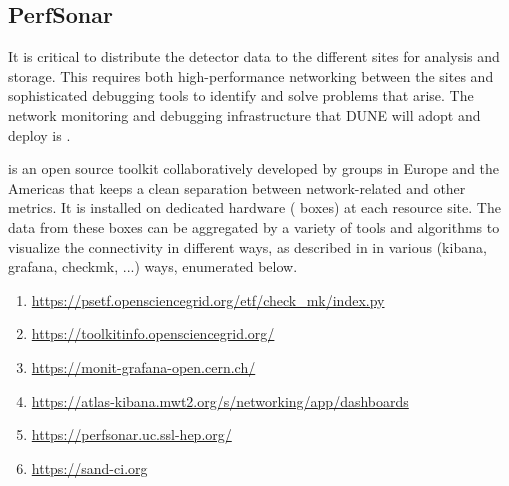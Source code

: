 \documentclass[../main-v1.tex]{subfiles}
\begin{document}


\subsection{PerfSonar}

It is critical to distribute the detector data to the different sites for analysis and storage. This requires both high-performance networking between the sites and sophisticated debugging tools to identify and solve problems that arise. The  network monitoring and debugging infrastructure that DUNE will adopt and deploy is .

 is an open source toolkit collaboratively developed by %
groups in Europe and the Americas that keeps a clean separation between network-related and other metrics. %
It is installed on dedicated hardware ( boxes) at %
each resource site. %
The data from these  boxes %
can be aggregated by a variety of tools and algorithms to %
visualize the connectivity in different ways, as described in  in various (kibana, grafana, checkmk, ...) ways, enumerated below.
\begin{enumerate}
    \item \url{https://psetf.opensciencegrid.org/etf/check_mk/index.py}
    \item \url{https://toolkitinfo.opensciencegrid.org/}
    \item \url{https://monit-grafana-open.cern.ch/}
    \item \url{https://atlas-kibana.mwt2.org/s/networking/app/dashboards}
    \item \url{https://perfsonar.uc.ssl-hep.org/}
    \item \url{https://sand-ci.org}
\end{enumerate}
\end{document}
